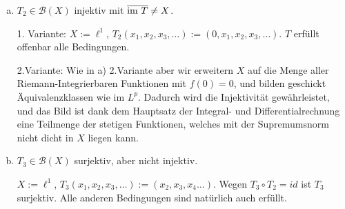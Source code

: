 \documentclass[ngerman]{article}
\theoremstyle{definition}%
\newcommand{\B}{\mathcal{B}} %
\newcommand{\im}{\textnormal{im }}
\renewcommand{\{ }{\left\lbrace}
\renewcommand{\}}{\right\rbrace}
\begin{document}
\begin{enumerate}[a)]
\item $T_2 \in \B(X)$ injektiv mit $\overline{\im T} \not =X$.\par 
	1. Variante:
	$X := \ell^1$, $T_2(x_1,x_2,x_3,\dots) := (0,x_1,x_2,x_3,\dots)$. $T$ erfüllt offenbar alle Bedingungen.\par\bigskip
	2.Variante:
	Wie in a) 2.Variante aber wir erweitern $X$ auf die Menge aller Riemann-Integrierbaren Funktionen mit $f(0)=0$, und bilden geschickt Äquivalenzklassen wie im $L^p$. Dadurch wird die Injektivität gewährleistet, und das Bild ist dank dem Hauptsatz der Integral- und Differentialrechnung eine Teilmenge der stetigen Funktionen, welches mit der Supremumsnorm nicht dicht in $X$ liegen kann.


\item $T_3 \in \B(X)$ surjektiv, aber nicht injektiv.\par 
	$X := \ell^1$, $T_3(x_1,x_2,x_3,\dots) := (x_2,x_3,x_4\dots)$. Wegen $T_3\circ T_2 = id$ ist $T_3$ surjektiv. Alle anderen Bedingungen sind natürlich auch erfüllt.

\end{enumerate}

\end{document}
